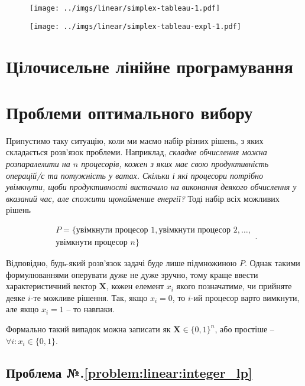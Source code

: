 \documentclass[\main/book.tex]{subfiles}
\begin{document}
\begin{figure}
 \centering
 \texttt{[image: ../imgs/linear/simplex-tableau-1.pdf]}
\end{figure}

\begin{figure}
 \centering
 \texttt{[image: ../imgs/linear/simplex-tableau-expl-1.pdf]}
\end{figure}
\section{Цілочисельне лінійне програмування}
\label{section:linear:integer}

\section{Проблеми оптимального вибору}
\label{section:linear:x_in_0-1}

Припустимо таку ситуацію, коли ми маємо набір різних рішень, з яких складається розв'язок проблеми. Наприклад, \textit{складне обчислення можна розпаралелити на $n$ процесорів, кожен з яких має свою продуктивність операцій/с та потужність у ватах. Скільки і які процесори потрібно увімкнути, щоби продуктивності вистачило на виконання деякого обчислення у вказаний час, але спожити щонайменше енергії?} Тоді набір всіх можливих рішень

\[
\begin{split}
P = \{
 \text{увімкнути процесор 1},
 \text{увімкнути процесор 2},
 \ldots, \\
 \text{увімкнути процесор $n$}
\}
\end{split}
.
\]

Відповідно, будь-який розв'язок задачі буде лише підмножиною $P$. Однак такими формулюваннями оперувати дуже не дуже зручно, тому краще ввести характеристичний вектор $\mathbf{X}$, кожен елемент $x_i$ якого позначатиме, чи прийняте деяке $i$-те можливе рішення. Так, якщо $x_i=0$, то $i$-ий процесор варто вимкнути, але якщо $x_i=1$ -- то навпаки.

\begin{note}
 Формально такий випадок можна записати як $\mathbf{X} \in \{0, 1\}^{n}$, або простіше -- $\forall i: x_i \in \{0, 1\}$.
\end{note}

\clearpage
{}

\subsection*{Проблема №.\ref{problem:linear:integer_lp}}
\end{document}
